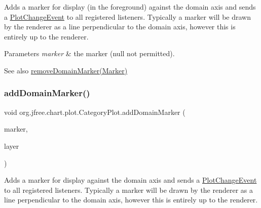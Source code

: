 Adds a marker for display (in the foreground) against the domain axis and sends a \mbox{\hyperlink{}{Plot\+Change\+Event}} to all registered listeners. Typically a marker will be drawn by the renderer as a line perpendicular to the domain axis, however this is entirely up to the renderer.


\begin{DoxyParams}{Parameters}
{\em marker} & the marker ({\ttfamily null} not permitted).\\
\hline
\end{DoxyParams}
\begin{DoxySeeAlso}{See also}
\mbox{\hyperlink{classorg_1_1jfree_1_1chart_1_1plot_1_1_category_plot_a2e59f00b94ab84347d6adc1a727399c0}{remove\+Domain\+Marker(\+Marker)}} 
\end{DoxySeeAlso}
\mbox{\label{classorg_1_1jfree_1_1chart_1_1plot_1_1_category_plot_a81f52af147abe363a5627f27a43e0dd2}} 
\subsubsection{\texorpdfstring{add\+Domain\+Marker()}{addDomainMarker()}\hspace{0.1cm}{\footnotesize\ttfamily [2/4]}}
{\footnotesize\ttfamily void org.\+jfree.\+chart.\+plot.\+Category\+Plot.\+add\+Domain\+Marker (\begin{DoxyParamCaption}\item[{\mbox{\hyperlink{classorg_1_1jfree_1_1chart_1_1plot_1_1_category_marker}{Category\+Marker}}}]{marker,  }\item[{Layer}]{layer }\end{DoxyParamCaption})}

Adds a marker for display against the domain axis and sends a \mbox{\hyperlink{}{Plot\+Change\+Event}} to all registered listeners. Typically a marker will be drawn by the renderer as a line perpendicular to the domain axis, however this is entirely up to the renderer.


